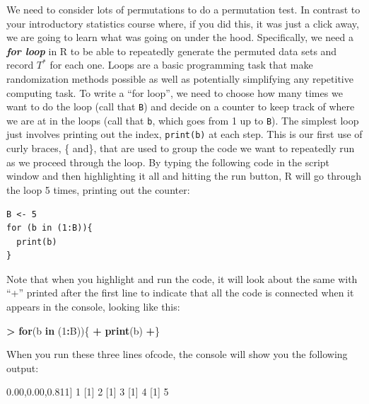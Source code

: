 \documentclass[]{book}
\newenvironment{Shaded}{\begin{snugshade}}{\end{snugshade}}
\newcommand{\KeywordTok}[1]{\textcolor[rgb]{0.13,0.29,0.53}{\textbf{#1}}}
\newcommand{\DecValTok}[1]{\textcolor[rgb]{0.00,0.00,0.81}{#1}}
\newcommand{\StringTok}[1]{\textcolor[rgb]{0.31,0.60,0.02}{#1}}
\newcommand{\ControlFlowTok}[1]{\textcolor[rgb]{0.13,0.29,0.53}{\textbf{#1}}}
\newcommand{\OperatorTok}[1]{\textcolor[rgb]{0.81,0.36,0.00}{\textbf{#1}}}
\newcommand{\NormalTok}[1]{#1}
\begin{document}
We need to consider lots of permutations to do a permutation test. In
contrast to your introductory statistics course where, if you did this,
it was just a click away, we are going to learn what was going on under
the hood. Specifically, we need a \textbf{\emph{for loop}} in R to be
able to repeatedly generate the permuted data sets and record \(T^*\)
for each one. Loops are a basic programming task that make randomization
methods possible as well as potentially simplifying any repetitive
computing task. To write a ``for loop'', we need to choose how many
times we want to do the loop (call that \texttt{B}) and decide on a
counter to keep track of where we are at in the loops (call that
\texttt{b}, which goes from 1 up to \texttt{B}). The simplest loop just
involves printing out the index, \texttt{print(b)} at each step. This is
our first use of curly braces, \{ and\}, that are used to group the code
we want to repeatedly run as we proceed through the loop. By typing the
following code in the script window and then highlighting it all and
hitting the run button, R will go through the loop 5 times, printing out
the counter:

\begin{verbatim}
B <- 5
for (b in (1:B)){
  print(b)
}
\end{verbatim}

Note that when you highlight and run the code, it will look about the
same with ``+'' printed after the first line to indicate that all the
code is connected when it appears in the console, looking like this:

\begin{Shaded}
\begin{Highlighting}[]
\OperatorTok{>}\StringTok{ }\ControlFlowTok{for}\NormalTok{(b }\ControlFlowTok{in}\NormalTok{ (}\DecValTok{1}\OperatorTok{:}\NormalTok{B))\{}
\OperatorTok{+}\StringTok{   }\KeywordTok{print}\NormalTok{(b)}
\OperatorTok{+}\NormalTok{\}}
\end{Highlighting}
\end{Shaded}

When you run these three lines ofcode, the console will show you the
following output:

\begin{Shaded}
\begin{Highlighting}[]
\NormalTok{[}\DecValTok{1}\NormalTok{] }\DecValTok{1}
\NormalTok{[}\DecValTok{1}\NormalTok{] }\DecValTok{2}
\NormalTok{[}\DecValTok{1}\NormalTok{] }\DecValTok{3}
\NormalTok{[}\DecValTok{1}\NormalTok{] }\DecValTok{4}
\NormalTok{[}\DecValTok{1}\NormalTok{] }\DecValTok{5}
\end{Highlighting}
\end{Shaded}
\end{document}
